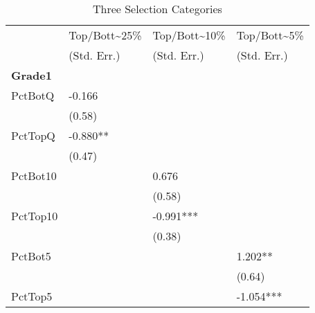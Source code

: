 \clearpage{}

\begin{table}[htb]
  \centering
  \begin{threeparttable}
    \caption{Three Selection Categories}\label{tab:d2}
    \begin{tabular}{l l l l} 
      \hline
      \hline
               & Top/Bott{\textasciitilde}25\% & Top/Bott{\textasciitilde}10\% & Top/Bott{\textasciitilde}5\% \\
               & (Std. Err.)                   & (Std. Err.)                   & (Std. Err.)                  \\
      \hline
      \textbf{Grade1}   &                               &                               &                              \\
      PctBotQ  & -0.166                        &                               &                              \\
               & (0.58)                        &                               &                              \\
      PctTopQ  & -0.880**                      &                               &                              \\
               & (0.47)                        &                               &                              \\
      PctBot10 &                               & 0.676                         &                              \\
               &                               & (0.58)                        &                              \\
      PctTop10 &                               & -0.991***                     &                              \\
               &                               & (0.38)                        &                              \\
      PctBot5  &                               &                               & 1.202**                      \\
               &                               &                               & (0.64)                       \\
      PctTop5  &                               &                               & -1.054***                    \\

\end{tabular}
\end{threeparttable}
\end{table}
